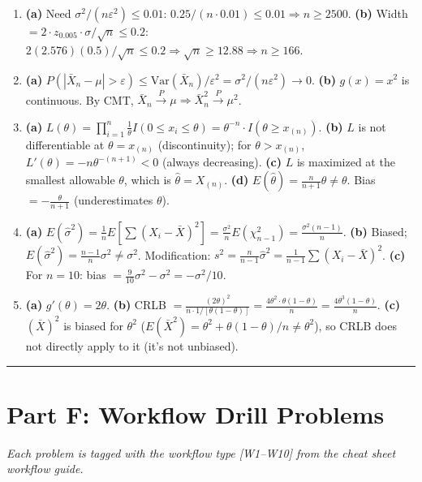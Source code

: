 \documentclass[11pt]{article}
\begin{document}
\begin{enumerate}[start=41]
\item \textbf{(a)} Need $\sigma^2/(n\varepsilon^2) \le 0.01$: $0.25/(n \cdot 0.01) \le 0.01 \Rightarrow n \ge 2500$. \textbf{(b)} Width $= 2 \cdot z_{0.005}\cdot\sigma/\sqrt{n} \le 0.2$: $2(2.576)(0.5)/\sqrt{n} \le 0.2 \Rightarrow \sqrt{n} \ge 12.88 \Rightarrow n \ge 166$.

\item \textbf{(a)} $P(|\bar X_n - \mu| > \varepsilon) \le \text{Var}(\bar X_n)/\varepsilon^2 = \sigma^2/(n\varepsilon^2) \to 0$. \textbf{(b)} $g(x) = x^2$ is continuous. By CMT, $\bar X_n \xrightarrow{P} \mu \Rightarrow \bar X_n^2 \xrightarrow{P} \mu^2$.

\item \textbf{(a)} $L(\theta) = \prod_{i=1}^n \frac{1}{\theta}I(0 \le x_i \le \theta) = \theta^{-n} \cdot I(\theta \ge x_{(n)})$. \textbf{(b)} $L$ is not differentiable at $\theta = x_{(n)}$ (discontinuity); for $\theta > x_{(n)}$, $L'(\theta) = -n\theta^{-(n+1)} < 0$ (always decreasing). \textbf{(c)} $L$ is maximized at the smallest allowable $\theta$, which is $\hat\theta = X_{(n)}$. \textbf{(d)} $E(\hat\theta) = \frac{n}{n+1}\theta \ne \theta$. Bias $= -\frac{\theta}{n+1}$ (underestimates $\theta$).

\item \textbf{(a)} $E(\hat\sigma^2) = \frac{1}{n}E\!\left[\sum(X_i-\bar X)^2\right] = \frac{\sigma^2}{n}E(\chi^2_{n-1}) = \frac{\sigma^2(n-1)}{n}$. \textbf{(b)} Biased; $E(\hat\sigma^2) = \frac{n-1}{n}\sigma^2 \ne \sigma^2$. Modification: $s^2 = \frac{n}{n-1}\hat\sigma^2 = \frac{1}{n-1}\sum(X_i-\bar X)^2$. \textbf{(c)} For $n=10$: bias $= \frac{9}{10}\sigma^2 - \sigma^2 = -\sigma^2/10$.

\item \textbf{(a)} $g'(\theta) = 2\theta$. \textbf{(b)} CRLB $= \frac{(2\theta)^2}{n \cdot 1/[\theta(1-\theta)]} = \frac{4\theta^2 \cdot \theta(1-\theta)}{n} = \frac{4\theta^3(1-\theta)}{n}$. \textbf{(c)} $(\bar X)^2$ is biased for $\theta^2$ ($E(\bar X^2) = \theta^2 + \theta(1-\theta)/n \ne \theta^2$), so CRLB does not directly apply to it (it's not unbiased).
\end{enumerate}

\bigskip
\hrule
\bigskip

\section{Part F: Workflow Drill Problems}
\textit{Each problem is tagged with the workflow type [W1--W10] from the cheat sheet workflow guide.}
\end{document}
